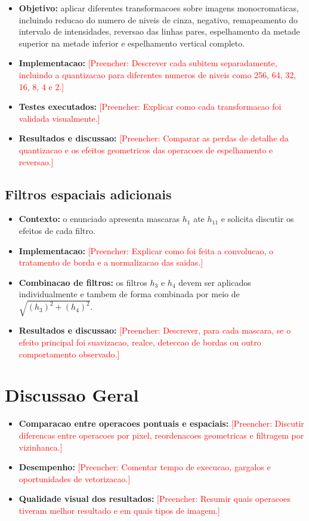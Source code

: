 \documentclass[12pt,a4paper]{article}
\newcommand{\placeholder}[1]{\textcolor{red}{[Preencher: #1]}}
\begin{document}
\begin{itemize}[leftmargin=*]
  \item \textbf{Objetivo:} aplicar diferentes transformacoes sobre imagens monocromaticas, incluindo reducao do numero de niveis de cinza, negativo, remapeamento do intervalo de intensidades, reversao das linhas pares, espelhamento da metade superior na metade inferior e espelhamento vertical completo.
  \item \textbf{Implementacao:} \placeholder{Descrever cada subitem separadamente, incluindo a quantizacao para diferentes numeros de niveis como 256, 64, 32, 16, 8, 4 e 2.}
  \item \textbf{Testes executados:} \placeholder{Explicar como cada transformacao foi validada visualmente.}
  \item \textbf{Resultados e discussao:} \placeholder{Comparar as perdas de detalhe da quantizacao e os efeitos geometricos das operacoes de espelhamento e reversao.}
\end{itemize}

\subsection{Filtros espaciais adicionais}

\begin{itemize}[leftmargin=*]
  \item \textbf{Contexto:} o enunciado apresenta mascaras $h_1$ ate $h_{11}$ e solicita discutir os efeitos de cada filtro.
  \item \textbf{Implementacao:} \placeholder{Explicar como foi feita a convolucao, o tratamento de borda e a normalizacao das saidas.}
  \item \textbf{Combinacao de filtros:} os filtros $h_3$ e $h_4$ devem ser aplicados individualmente e tambem de forma combinada por meio de $\sqrt{(h_3)^2 + (h_4)^2}$.
  \item \textbf{Resultados e discussao:} \placeholder{Descrever, para cada mascara, se o efeito principal foi suavizacao, realce, deteccao de bordas ou outro comportamento observado.}
\end{itemize}

\section{Discussao Geral}

\begin{itemize}[leftmargin=*]
  \item \textbf{Comparacao entre operacoes pontuais e espaciais:} \placeholder{Discutir diferencas entre operacoes por pixel, reordenacoes geometricas e filtragem por vizinhanca.}
  \item \textbf{Desempenho:} \placeholder{Comentar tempo de execucao, gargalos e oportunidades de vetorizacao.}
  \item \textbf{Qualidade visual dos resultados:} \placeholder{Resumir quais operacoes tiveram melhor resultado e em quais tipos de imagem.}
\end{itemize}
\end{document}

